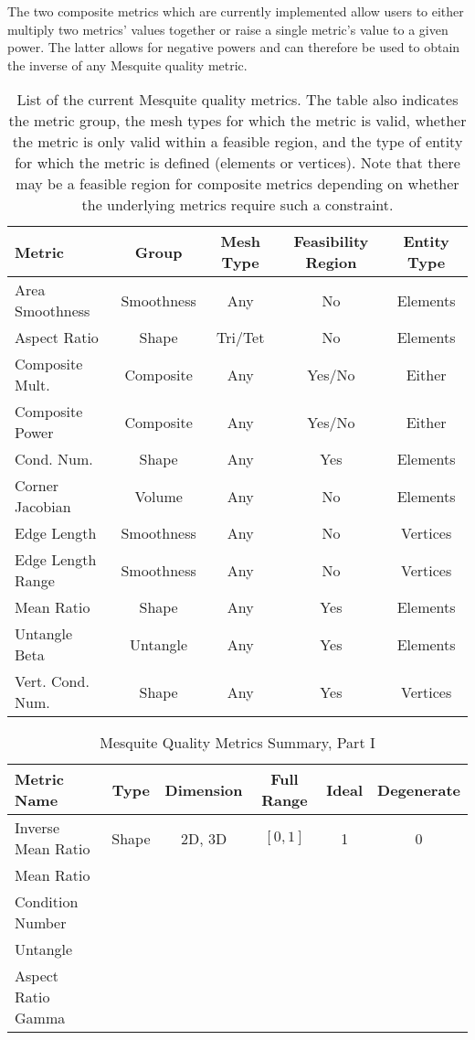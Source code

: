 \documentclass[psfig]{article}
\begin{document}
The two composite metrics which are currently implemented
allow users to either multiply two metrics' values
together or raise a single metric's value to a given power.
The latter allows for negative powers and can therefore be used
to obtain the inverse of any Mesquite quality metric.  

\begin{table*}[htb]
\begin{center}
\begin{tabular}{|l|c|c|c|c|}
\hline
Metric & Group & Mesh Type & Feasibility Region &Entity Type\\
\hline
Area Smoothness &Smoothness & Any & No & Elements\\
Aspect Ratio & Shape &Tri/Tet & No & Elements\\
Composite Mult. & Composite &Any& Yes/No & Either\\
Composite Power & Composite &Any& Yes/No & Either\\
Cond. Num.& Shape & Any & Yes & Elements \\
Corner Jacobian & Volume & Any & No & Elements \\
Edge Length &Smoothness & Any & No & Vertices \\
Edge Length Range & Smoothness & Any &No & Vertices\\
Mean Ratio &Shape & Any & Yes &Elements\\
Untangle Beta &Untangle &Any&Yes&Elements\\
Vert. Cond. Num.& Shape & Any & Yes & Vertices\\
\hline
\end{tabular}
\label{current-metrics}
\caption{List of the current Mesquite quality metrics. The table also
indicates the metric group, the mesh types for which the metric is
valid, whether the metric is only valid within a feasible
region, and the type of entity for which the metric is defined (elements
or vertices).  Note that there may be a feasible region for composite
metrics depending on whether the underlying metrics require such a
constraint.}
\end{center}
\end{table*}


\begin{table}[h]
\begin{center}
\begin{tabular}{|l|c|c|c|c|c|}
\hline
Metric Name & Type & Dimension & Full Range & Ideal & Degenerate \\ \hline
Inverse Mean Ratio & Shape & 2D, 3D & $[0,1]$ & 1 & 0 \\ 
Mean Ratio &  &  &  &  &  \\ 
Condition Number &  &  &  &  &  \\ 
Untangle &  &  &  &  &  \\ 
Aspect Ratio Gamma &  &  &  &  &  \\ 
\hline
\end{tabular}
\caption{\label{QualityMetrics1} Mesquite Quality Metrics Summary, Part I}
\end{center}
\end{table}
\end{document}
